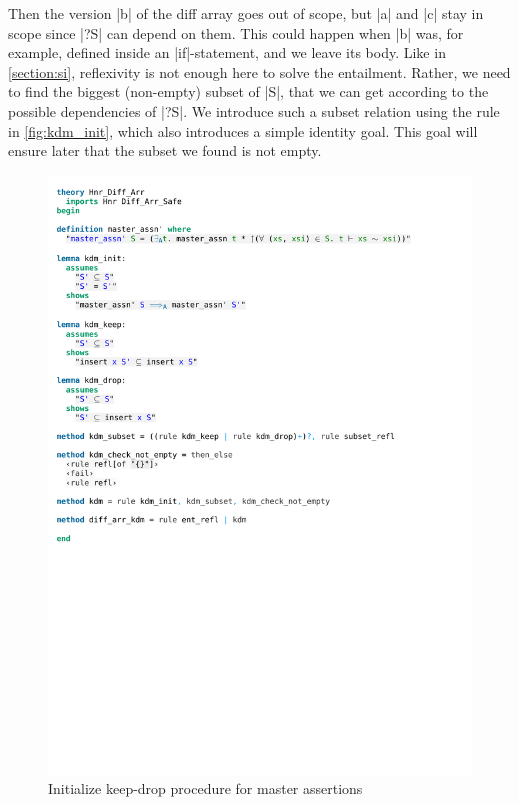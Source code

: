 \noindent Then the version |b| of the diff array goes out of scope, but |a| and |c| stay in scope since |?S| can depend on them. This could happen when |b| was, for example, defined inside an |if|-statement, and we leave its body. Like in \autoref{section:si}, reflexivity is not enough here to solve the entailment. Rather, we need to find the biggest (non-empty) subset of |S|, that we can get according to the possible dependencies of |?S|.
We introduce such a subset relation using the rule in  \autoref{fig:kdm_init}, which also introduces a simple identity goal. This goal will ensure later that the subset we found is not empty.

\begin{figure}[htpb]
    \includegraphics[trim={0 22,8cm 0 3,9cm}, clip, width=1.00\textwidth]{figures/Theory_Hnr_Diff_Arr_KDM.pdf}
    \caption[Initialize keep-drop procedure for master assertions]{Initialize keep-drop procedure for master assertions}
    \label{fig:kdm_init}
\end{figure}

